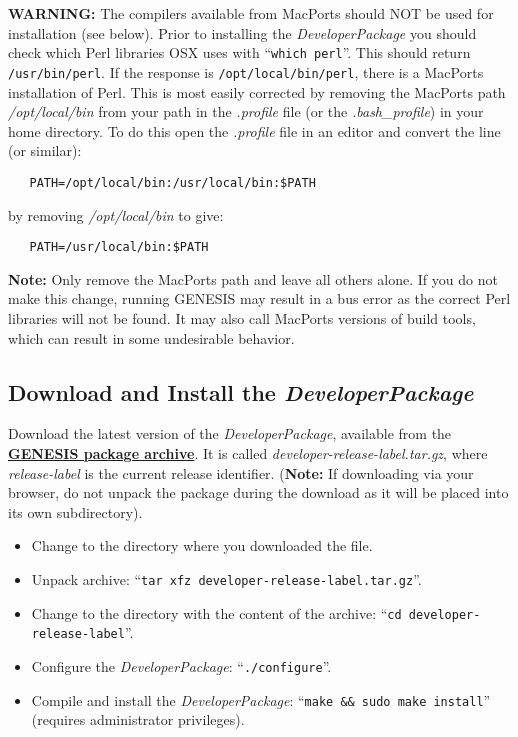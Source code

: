 \documentclass[12pt]{article}
\begin{document}
   {\bf WARNING:} The compilers available from MacPorts should NOT be used for installation (see below). Prior to installing the {\it DeveloperPackage} you should check which Perl libraries OSX uses with ``{\tt  which perl}''. This should return {\tt  /usr/bin/perl}. If the response is {\tt /opt/local/bin/perl}, there is a MacPorts installation of Perl. This is most easily corrected by removing the MacPorts path {\it /opt/local/bin} from your path in the {\it .profile} file (or the {\it .bash\_profile}) in your home directory. To do this open the  {\it .profile} file in an editor and convert the line (or similar):
\begin{verbatim}
   PATH=/opt/local/bin:/usr/local/bin:$PATH
\end{verbatim}
by removing {\it /opt/local/bin} to give:
\begin{verbatim}
   PATH=/usr/local/bin:$PATH
\end{verbatim}
{\bf Note:} Only remove the MacPorts path and leave all others alone. If you do not make this change, running GENESIS may result in a bus error as the correct Perl libraries will not be found. It may also call MacPorts versions of build tools, which can result in some undesirable behavior.  
   
   
\subsection*{Download and Install the {\it DeveloperPackage}}

Download the latest version of the {\it DeveloperPackage}, available from the \href{http://repo-genesis3.cbi.utsa.edu/src/}{\bf GENESIS package archive}.  It is called {\it developer-release-label.tar.gz}, where {\it release-label} is the current release identifier. ({\bf Note:} If downloading via your browser, do not unpack the package during the download as it will be placed into its own subdirectory).
\begin{itemize}
   \item[] Change to the directory where you downloaded the file.
   \item[] Unpack archive: ``{\tt tar xfz developer-release-label.tar.gz}''.
   \item[] Change to the directory with the content of the archive: ``{\tt cd developer-release-label}''.
   \item[] Configure the {\it DeveloperPackage}: ``{\tt ./configure}''.
   \item[] Compile and install the {\it DeveloperPackage}: ``{\tt make \&\& sudo make install}'' (requires administrator privileges).
\end{itemize}
\end{document}
